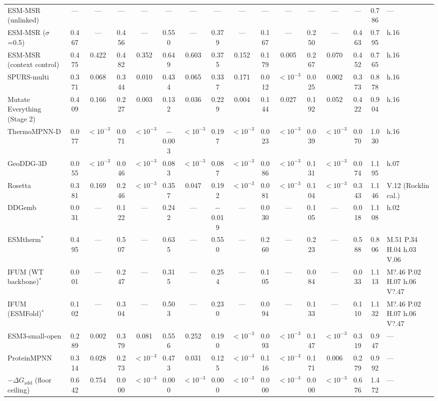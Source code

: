 \begin{table}[H]
{\begin{tabular}{lccccccccccccccl}
ESM-MSR (unlinked) & --- & --- & --- & --- & --- & --- & --- & --- & --- & --- & --- & --- & --- & 0.786 & --- \\
ESM-MSR ($\sigma$=0.5) & 0.467 & --- & 0.456 & --- & 0.550 & --- & 0.379 & --- & 0.167 & --- & 0.250 & --- & 0.463 & 0.795 & h.16 \\
ESM-MSR (context control) & 0.475 & 0.422 & 0.482 & 0.352 & 0.649 & 0.603 & 0.375 & 0.152 & 0.179 & 0.005 & 0.267 & 0.070 & 0.452 & 0.765 & h.16 \\
SPURS-multi & 0.371 & 0.068 & 0.344 & 0.010 & 0.434 & 0.065 & 0.337 & 0.171 & 0.012 & $<10^{-3}$ & 0.025 & 0.002 & 0.373 & 0.878 & h.16 \\
Mutate Everything (Stage 2) & 0.409 & 0.166 & 0.227 & 0.003 & 0.132 & 0.036 & 0.229 & 0.004 & 0.144 & 0.027 & 0.192 & 0.052 & 0.422 & 0.904 & h.16 \\
ThermoMPNN-D & 0.077 & $<10^{-3}$ & 0.071 & $<10^{-3}$ & $-$0.003 & $<10^{-3}$ & 0.197 & $<10^{-3}$ & 0.023 & $<10^{-3}$ & 0.039 & $<10^{-3}$ & 0.070 & 1.030 & h.16 \\
GeoDDG-3D & 0.055 & $<10^{-3}$ & 0.046 & $<10^{-3}$ & 0.083 & $<10^{-3}$ & 0.087 & $<10^{-3}$ & 0.086 & $<10^{-3}$ & 0.131 & $<10^{-3}$ & 0.074 & 1.195 & h.07 \\
Rosetta & 0.381 & 0.169 & 0.246 & $<10^{-3}$ & 0.357 & 0.047 & 0.192 & $<10^{-3}$ & 0.081 & $<10^{-3}$ & 0.104 & $<10^{-3}$ & 0.343 & 1.146 & V.12 (Rocklin cal.) \\
DDGemb & 0.031 & --- & 0.122 & --- & 0.242 & --- & $-$0.019 & --- & 0.030 & --- & 0.105 & --- & 0.018 & 1.108 & h.02 \\
ESMtherm$^*$ & 0.495 & --- & 0.507 & --- & 0.635 & --- & 0.550 & --- & 0.260 & --- & 0.223 & --- & 0.588 & 0.806 & M.51 P.34 H.04 h.03 V.06 \\
IFUM (WT backbone)$^*$ & 0.001 & --- & 0.247 & --- & 0.315 & --- & 0.254 & --- & 0.105 & --- & 0.084 & --- & 0.033 & 1.113 & M?.46 P.02 H.07 h.06 V?.47 \\
IFUM (ESMFold)$^*$ & 0.102 & --- & 0.304 & --- & 0.503 & --- & 0.230 & --- & 0.094 & --- & 0.133 & --- & 0.110 & 1.132 & M?.46 P.02 H.07 h.06 V?.47 \\
ESM3-small-open & 0.289 & 0.002 & 0.379 & 0.081 & 0.556 & 0.252 & 0.190 & $<10^{-3}$ & 0.093 & $<10^{-3}$ & 0.147 & $<10^{-3}$ & 0.319 & 0.947 & --- \\
ProteinMPNN & 0.314 & 0.028 & 0.273 & $<10^{-3}$ & 0.473 & 0.031 & 0.125 & $<10^{-3}$ & 0.116 & $<10^{-3}$ & 0.171 & 0.006 & 0.279 & 0.992 & --- \\
$-\Delta G_{\mathrm{add}}$ (floor ceiling) & 0.642 & 0.754 & 0.000 & $<10^{-3}$ & 0.000 & $<10^{-3}$ & 0.000 & $<10^{-3}$ & 0.000 & $<10^{-3}$ & 0.000 & $<10^{-3}$ & 0.676 & 1.472 & --- \\
\bottomrule
\end{tabular}
}
\end{table}



